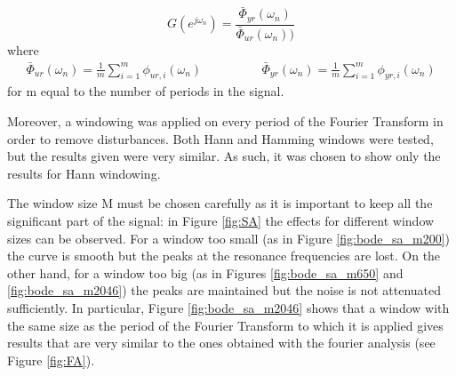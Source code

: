 \documentclass[a4paper,11pt]{article}
\begin{document}
\begin{equation}
G(e^{j\omega_n}) = \frac{\bar{\Phi}_{yr}(\omega_n)}{\bar{\Phi}_{ur}(\omega_n))} 
\end{equation}
where
\begin{align}
\bar{\Phi}_{ur}(\omega_n) =\frac{1}{m} \sum_{i=1}^{m} \phi_{ur,i}(\omega_n)
&\qquad\qquad
\bar{\Phi}_{yr}(\omega_n) =\frac{1}{m} \sum_{i=1}^{m} \phi_{yr,i}(\omega_n)
\end{align}
for m equal to the number of periods in the signal. 

Moreover, a windowing was applied on every period of the Fourier Transform in order to remove disturbances. Both Hann and Hamming windows were tested, but the results given were very similar. As such, it was chosen to show only the results for Hann windowing. 

The window size M must be chosen carefully as it is important to keep all the significant part of the signal: in Figure \ref{fig:SA} the effects for different window sizes can be observed. For a window too small (as in Figure \ref{fig:bode_sa_m200}) the curve is smooth but the peaks at the resonance frequencies are lost. On the other hand, for a window too big (as in Figures \ref{fig:bode_sa_m650} and \ref{fig:bode_sa_m2046}) the peaks are maintained but the noise is not attenuated sufficiently. In particular, Figure \ref{fig:bode_sa_m2046} shows that a window with the same size as the period of the Fourier Transform to which it is applied gives results that are very similar to the ones obtained with the fourier analysis (see Figure \ref{fig:FA}).
\end{document}
